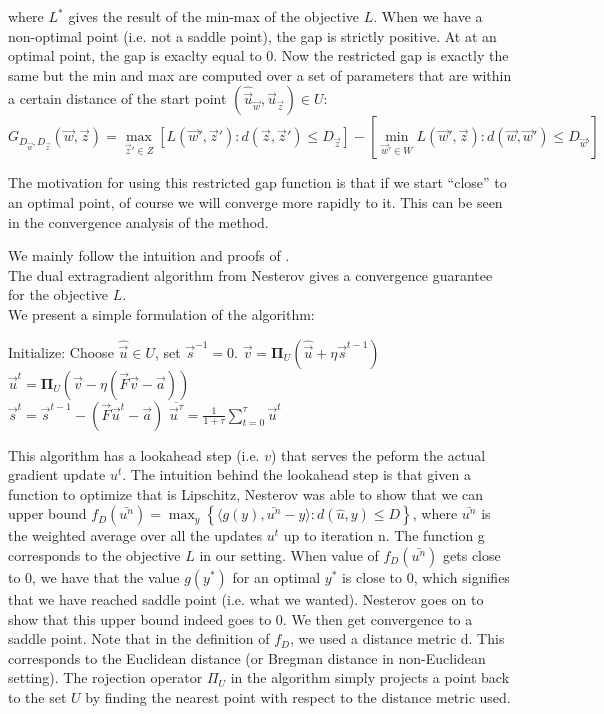 where ${L}^*$ gives the result of the min-max of the objective
${L}$. When we have a non-optimal point (i.e. not a saddle point), the
gap is strictly positive. At at an optimal point, the gap is exaclty equal to 0.
Now the restricted gap is exactly the same but the min and max are computed over
a set of parameters that are within a certain distance of the start point
$(\hat{\vec u}_{\vec w},\hat{\vec u}_{\vec z}) \in {U}$:
\begin{equation}
  {G}_{D_{\vec w}, D_{\vec z}}(\vec w, \vec z) = \max_{\vec z' \in
{Z}} \left[ {L}(\vec w', \vec z') : d(\vec z, \vec z') \leq
D_{\vec z} \right] - \left [ \min_{\vec w' \in {W}} {L}(\vec w',
\vec z) : d(\vec w, \vec w') \leq D_{\vec w'} \right ]
\end{equation}

The motivation for using this restricted gap function is that if we start
``close'' to an optimal point, of course we will converge more rapidly to it.
This can be seen in the convergence analysis of the method.






We mainly follow the intuition and proofs of
\cite{taskarStructuredPredictionDual2006}.\\
The dual extragradient algorithm from Nesterov gives a convergence guarantee for
the objective ${L}$.\\
We present a simple formulation of the algorithm:
\begin{algorithmic}
  \STATE Initialize: Choose $\hat{\vec u} \in {U}$, set $\vec s^{-1} = 0$.
  \STATE $\vec v = \mathbf{\Pi}_{{U}}(\hat{\vec u} + \eta \vec s^{t-1})$\\
  \STATE $\vec u^t = \mathbf{\Pi}_{{U}}(\vec v - \eta (\vec F \vec v - \vec a))$\\
  \STATE $\vec s^t =  \vec s^{t-1} - (\vec F \vec u^t - \vec a)$
  \ENDFOR
  \RETURN $\overline{\vec u^{\tau}} = \frac{1}{1 + \tau} \sum_{t=0}^{\tau} \vec u^t$
\end{algorithmic}

This algorithm has a lookahead step (i.e. $v$) that serves the peform the actual
gradient update $u^t$. The intuition behind the lookahead step is that given a
function to optimize that is Lipschitz, Nesterov was able to show that we can
upper bound $f_{D}(\bar{u^n}) = \max_y \left \{ \langle g(y),\bar{u^n} - y
\rangle : d(\hat{u},y) \leq D \right \}$, where $\bar{u^n}$ is the weighted
average over all the updates $u^t$ up to iteration n. The function g corresponds
to the objective ${L}$ in our setting. When value of $f_D(\bar{u^n})$
gets close to 0, we have that the value $g(y^*)$ for an optimal $y^*$ is close
to 0, which signifies that we have reached saddle point (i.e. what we wanted).
Nesterov goes on to show that this upper bound indeed goes to 0. We then get
convergence to a saddle point. Note that in the definition of $f_D$, we used a
distance metric d. This corresponds to the Euclidean distance (or Bregman
distance in non-Euclidean setting). The rojection operator $\Pi_{{U}}$
in the algorithm simply projects a point back to the set ${U}$ by
finding the nearest point with respect to the distance metric used.

